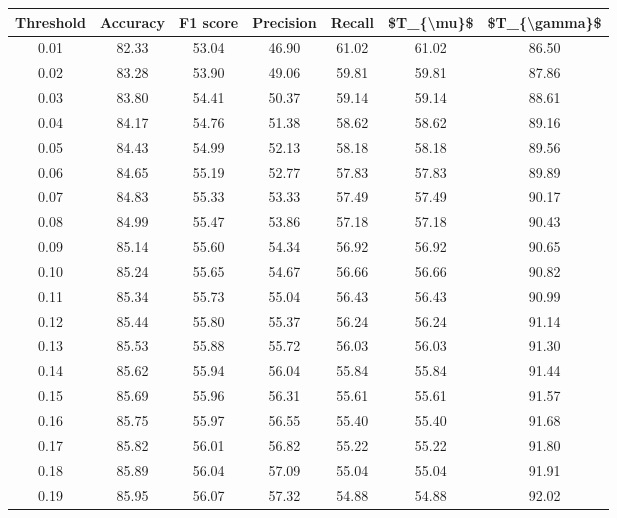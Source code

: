 \begin{tabular}{|c|c|c|c|c|c|c|}
\hline
 Threshold &  Accuracy &  F1 score &  Precision &  Recall &  \$T\_\{\textbackslash mu\}\$ &  \$T\_\{\textbackslash gamma\}\$ \\
\hline
      0.01 &     82.33 &     53.04 &      46.90 &   61.02 &      61.02 &         86.50 \\
      0.02 &     83.28 &     53.90 &      49.06 &   59.81 &      59.81 &         87.86 \\
      0.03 &     83.80 &     54.41 &      50.37 &   59.14 &      59.14 &         88.61 \\
      0.04 &     84.17 &     54.76 &      51.38 &   58.62 &      58.62 &         89.16 \\
      0.05 &     84.43 &     54.99 &      52.13 &   58.18 &      58.18 &         89.56 \\
      0.06 &     84.65 &     55.19 &      52.77 &   57.83 &      57.83 &         89.89 \\
      0.07 &     84.83 &     55.33 &      53.33 &   57.49 &      57.49 &         90.17 \\
      0.08 &     84.99 &     55.47 &      53.86 &   57.18 &      57.18 &         90.43 \\
      0.09 &     85.14 &     55.60 &      54.34 &   56.92 &      56.92 &         90.65 \\
      0.10 &     85.24 &     55.65 &      54.67 &   56.66 &      56.66 &         90.82 \\
      0.11 &     85.34 &     55.73 &      55.04 &   56.43 &      56.43 &         90.99 \\
      0.12 &     85.44 &     55.80 &      55.37 &   56.24 &      56.24 &         91.14 \\
      0.13 &     85.53 &     55.88 &      55.72 &   56.03 &      56.03 &         91.30 \\
      0.14 &     85.62 &     55.94 &      56.04 &   55.84 &      55.84 &         91.44 \\
      0.15 &     85.69 &     55.96 &      56.31 &   55.61 &      55.61 &         91.57 \\
      0.16 &     85.75 &     55.97 &      56.55 &   55.40 &      55.40 &         91.68 \\
      0.17 &     85.82 &     56.01 &      56.82 &   55.22 &      55.22 &         91.80 \\
      0.18 &     85.89 &     56.04 &      57.09 &   55.04 &      55.04 &         91.91 \\
      0.19 &     85.95 &     56.07 &      57.32 &   54.88 &      54.88 &         92.02 \\

\end{tabular}
